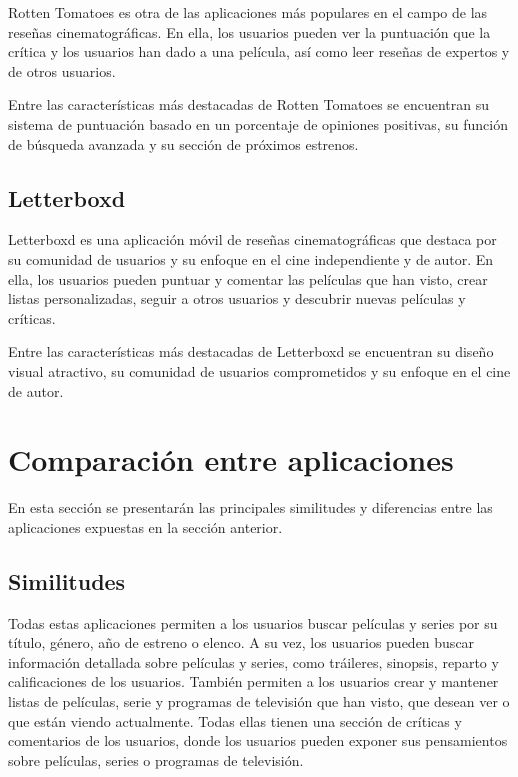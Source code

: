 Rotten Tomatoes es otra de las aplicaciones más populares en el campo de las reseñas cinematográficas. 
En ella, los usuarios pueden ver la puntuación que la crítica y los usuarios han dado a una película, 
así como leer reseñas de expertos y de otros usuarios.

Entre las características más destacadas de Rotten Tomatoes se encuentran su sistema de puntuación 
basado en un porcentaje de opiniones positivas, su función de búsqueda avanzada y su sección de 
próximos estrenos.

\subsection{Letterboxd}

Letterboxd es una aplicación móvil de reseñas cinematográficas que destaca por su comunidad de usuarios 
y su enfoque en el cine independiente y de autor. En ella, los usuarios pueden puntuar y comentar las 
películas que han visto, crear listas personalizadas, seguir a otros usuarios y descubrir nuevas 
películas y críticas.

Entre las características más destacadas de Letterboxd se encuentran su diseño visual atractivo, su 
comunidad de usuarios comprometidos y su enfoque en el cine de autor.


\section{Comparación entre aplicaciones}

En esta sección se presentarán las principales similitudes y diferencias entre las aplicaciones 
expuestas en la sección anterior.

\subsection{Similitudes}

Todas estas aplicaciones permiten a los usuarios buscar películas y series por su título, género, año 
de estreno o elenco. A su vez, los usuarios pueden buscar información detallada sobre películas y 
series, como tráileres, sinopsis, reparto y calificaciones de los usuarios. También permiten a los 
usuarios crear y mantener listas de películas, serie y programas de televisión que han visto, que 
desean ver o que están viendo actualmente. Todas ellas tienen una sección de críticas y comentarios de 
los usuarios, donde los usuarios pueden exponer sus pensamientos sobre películas, series o programas de 
televisión.

